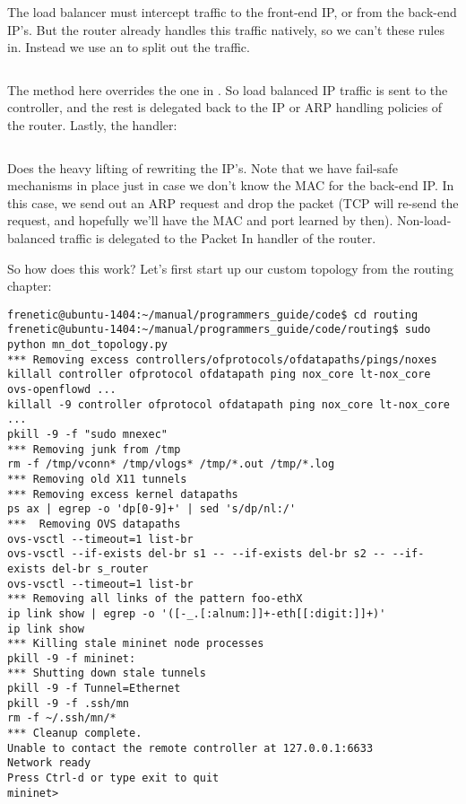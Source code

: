 The load balancer must intercept traffic to the front-end IP, or from the back-end IP's.  But the
router already handles this traffic natively, so we can't  these rules in.   Instead
we use an  to split out the traffic.  

\inputminted[firstline=19,lastline=30]{python}{code/routing_variants/load_balancer_handler.py} 

The  method here overrides the one in .  So load balanced
IP traffic is sent to the controller,  and the rest is delegated back to the IP or ARP handling
policies of the router.  Lastly, the  handler:

\inputminted[firstline=32]{python}{code/routing_variants/load_balancer_handler.py} 

Does the heavy lifting of rewriting the IP's.  Note that we have fail-safe mechanisms in place
just in case we don't know the MAC for the back-end IP.  In this case, we send out an ARP request
and drop the packet (TCP will re-send the request, and hopefully we'll have the MAC and port
learned by then).  Non-load-balanced traffic is delegated to the Packet In handler of the
router.  

So how does this work?  Let's first start up our custom topology from the routing chapter:

\begin{verbatim}
frenetic@ubuntu-1404:~/manual/programmers_guide/code$ cd routing
frenetic@ubuntu-1404:~/manual/programmers_guide/code/routing$ sudo python mn_dot_topology.py
*** Removing excess controllers/ofprotocols/ofdatapaths/pings/noxes
killall controller ofprotocol ofdatapath ping nox_core lt-nox_core ovs-openflowd ...
killall -9 controller ofprotocol ofdatapath ping nox_core lt-nox_core ...
pkill -9 -f "sudo mnexec"
*** Removing junk from /tmp
rm -f /tmp/vconn* /tmp/vlogs* /tmp/*.out /tmp/*.log
*** Removing old X11 tunnels
*** Removing excess kernel datapaths
ps ax | egrep -o 'dp[0-9]+' | sed 's/dp/nl:/'
***  Removing OVS datapaths
ovs-vsctl --timeout=1 list-br
ovs-vsctl --if-exists del-br s1 -- --if-exists del-br s2 -- --if-exists del-br s_router
ovs-vsctl --timeout=1 list-br
*** Removing all links of the pattern foo-ethX
ip link show | egrep -o '([-_.[:alnum:]]+-eth[[:digit:]]+)'
ip link show
*** Killing stale mininet node processes
pkill -9 -f mininet:
*** Shutting down stale tunnels
pkill -9 -f Tunnel=Ethernet
pkill -9 -f .ssh/mn
rm -f ~/.ssh/mn/*
*** Cleanup complete.
Unable to contact the remote controller at 127.0.0.1:6633
Network ready
Press Ctrl-d or type exit to quit
mininet>
\end{verbatim}

